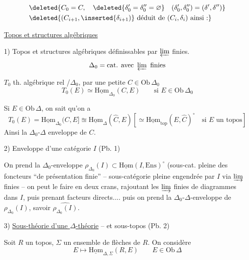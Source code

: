 \[
\begin{aligned}
&\deleted{C_0=C,\quad\deleted{\delta'_0=\delta''_0=\varnothing}\quad(\delta'_0,\delta''_0)=(\delta',\delta'')}\\
&\deleted{(C_{i+1},\inserted{\delta_{i+1})}\text{ déduit de }(C_i,\delta_i)\text{ ainsi :}}
\end{aligned}
\]


\uline{Topos et structures algébriques}


1) Topos et structures algébriques définissables par $\varprojlim$ finies.
\[
\Delta_0=\text{cat. avec }\varprojlim\text{ finies}
\]

$T_0$ th. algébrique rel /$\Delta_0$,  par une petite $C\in\mathrm{Ob}\,\Delta_0$\\
\[
T_0(E)\simeq\underline{\mathrm{Hom}}_{\Delta_0}(C,E)\qquad\text{si }E\in\mathrm{Ob}\,\Delta_0
\]

Si $E\in\mathrm{Ob}\,\Delta$, on sait qu'on a
\[
T_0(E)=\underline{\mathrm{Hom}}_{\Delta_0}(C,E]\approxeq\underline{\mathrm{Hom}}_\Delta(\widehat C,E)
\left[\simeq\underline{\mathrm{Hom}}_{\mathrm{top}}(E,\widehat C)^\circ\quad\text{si }E\text{ un topos}\right]
\]
Ainsi  la  $\Delta_0$-$\Delta$ enveloppe de $C$.

2) \inserted{$\Delta$-}Enveloppe d'une  catégorie $I$ (Pb. 1)

On prend la $\Delta_0$-enveloppe $\rho_{\Delta_0}(I)\subset\underline{\mathrm{Hom}}(I,\mathrm{Ens})^\circ$ (sous-cat. pleine des foncteurs ``de présentation finie'' -- sous-catégorie pleine engendrée par $I$ via $\varinjlim$ finies -- on peut le faire en deux crans, rajoutant les $\varinjlim$ finies de diagrammes dans $I$, puis prenant facteurs directs.... puis on prend la $\Delta_0$-$\Delta$-enveloppe de $\rho_{\Delta_0}(I)$, savoir $\widehat{\rho_{\Delta_0}(I)}$.

3) \uline{Sous-théorie d'une $\Delta$-théorie}  -- et sous-topos (Pb. 2)

Soit $R$ un topos, $\Sigma$ un ensemble de flèches de $R$. On considère
\[
E\longmapsto\underline{\mathrm{Hom}}_{\Delta,\Sigma}(R,E)\qquad E\in\mathrm{Ob}\,\Delta
\]

